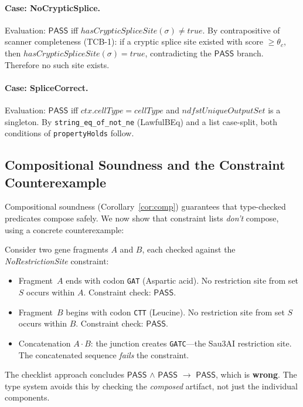 \documentclass[runningheads]{llncs}
\newcommand{\PASS}{\ensuremath{\mathsf{PASS}}\xspace}
\newcommand{\seq}{\sigma}
\begin{document}
\paragraph{Case: NoCrypticSplice.}
Evaluation: \PASS{} iff $\mathit{hasCrypticSpliceSite}(\seq) \neq
\mathit{true}$.
By contrapositive of scanner completeness (TCB-1): if a cryptic splice
site existed with score $\ge \theta_c$, then
$\mathit{hasCrypticSpliceSite}(\seq) = \mathit{true}$, contradicting
the \PASS{} branch.
Therefore no such site exists.

\paragraph{Case: SpliceCorrect.}
Evaluation: \PASS{} iff $\mathit{ctx.cellType} = \mathit{cellType}$
and $\mathit{ndfstUniqueOutputSet}$ is a singleton.
By \texttt{string\_eq\_of\_not\_ne} (LawfulBEq) and a list
case-split, both conditions of \texttt{propertyHolds} follow.

\subsection{Compositional Soundness and the Constraint Counterexample}

Compositional soundness (Corollary~\ref{cor:comp}) guarantees that
type-checked predicates compose safely.
We now show that constraint lists \emph{don't} compose, using a
concrete counterexample:

\begin{example}
Consider two gene fragments $A$ and $B$, each checked against the
\emph{NoRestrictionSite} constraint:
\begin{itemize}[leftmargin=*,itemsep=0pt,topsep=1pt]
\item Fragment~$A$ ends with codon \texttt{GAT} (Aspartic acid).
      No restriction site from set $S$ occurs within $A$.
      Constraint check: \PASS.
\item Fragment~$B$ begins with codon \texttt{CTT} (Leucine).
      No restriction site from set $S$ occurs within $B$.
      Constraint check: \PASS.
\item Concatenation $A \cdot B$: the junction creates
      \texttt{GATC}---the Sau3AI restriction site.
      The concatenated sequence \emph{fails} the constraint.
\end{itemize}
The checklist approach concludes \PASS{} $\wedge$ \PASS{}
$\to$ \PASS{}, which is \textbf{wrong}.
The type system avoids this by checking the \emph{composed} artifact,
not just the individual components.
\end{example}
\end{document}
